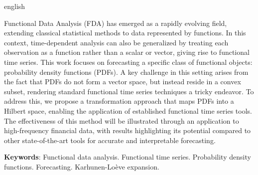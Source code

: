 \documentclass[
	12pt,				%
	oneside,			%
	a4paper,			%
	english,			%
	brazil				%
	]{abntex2ppgsi}
\begin{document}
% 
% 
\begin{resumo}[Abstract]
\begin{otherlanguage*}{english}

% 
%
%
%

Functional Data Analysis (FDA) has emerged as a rapidly evolving field, extending classical statistical methods to data represented by functions. In this context, time-dependent analysis can also be generalized by treating each observation as a function rather than a scalar or vector, giving rise to functional time series. This work focuses on forecasting a specific class of functional objects: probability density functions (PDFs). A key challenge in this setting arises from the fact that PDFs do not form a vector space, but instead reside in a convex subset, rendering standard functional time series techniques a tricky endeavor. To address this, we propose a transformation approach that maps PDFs into a Hilbert space, enabling the application of established functional time series tools. The effectiveness of this method will be illustrated through an application to high-frequency financial data, with results highlighting its potential compared to other state-of-the-art tools for accurate and interpretable forecasting.

\textbf{Keywords}: Functional data analysis. Functional time series. Probability density functions. Forecasting. Karhunen-Loève expansion. 

\end{otherlanguage*}
\end{resumo}
\end{document}

